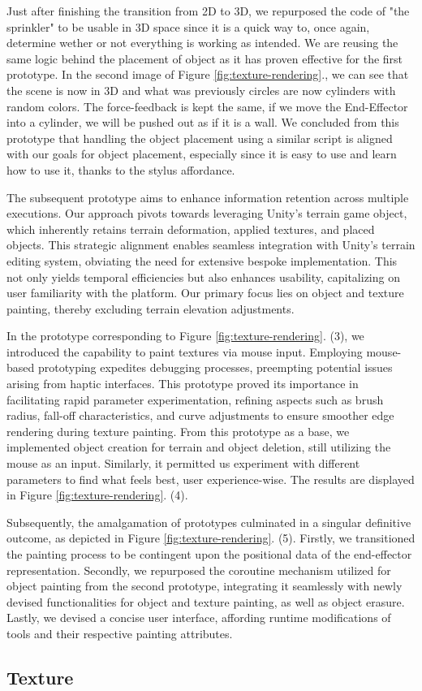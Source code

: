 Just after finishing the transition from 2D to 3D, we repurposed the code of "the sprinkler" to be usable in 3D space since it is a quick way to, once again, determine wether or not everything is working as intended.
We are reusing the same logic behind the placement of object as it has proven effective for the first prototype.
In the second image of Figure \ref{fig:texture-rendering}., we can see that the scene is now in 3D and what was previously circles are now cylinders with random colors.
The force-feedback is kept the same, if we move the End-Effector into a cylinder, we will be pushed out as if it is a wall.
We concluded from this prototype that handling the object placement using a similar script is aligned with our goals for object placement, especially since it is easy to use and learn how to use it, thanks to the stylus affordance. 

The subsequent prototype aims to enhance information retention across multiple executions. 
Our approach pivots towards leveraging Unity's terrain game object, which inherently retains terrain deformation, applied textures, and placed objects. 
This strategic alignment enables seamless integration with Unity's terrain editing system, obviating the need for extensive bespoke implementation. 
This not only yields temporal efficiencies but also enhances usability, capitalizing on user familiarity with the platform. 
Our primary focus lies on object and texture painting, thereby excluding terrain elevation adjustments. 

In the prototype corresponding to Figure \ref{fig:texture-rendering}. (3), we introduced the capability to paint textures via mouse input. 
Employing mouse-based prototyping expedites debugging processes, preempting potential issues arising from haptic interfaces. 
This prototype proved its importance in facilitating rapid parameter experimentation, refining aspects such as brush radius, fall-off characteristics, and curve adjustments to ensure smoother edge rendering during texture painting.
From this prototype as a base, we implemented object creation for terrain and object deletion, still utilizing the mouse as an input.
Similarly, it permitted us experiment with different parameters to find what feels best, user experience-wise. 
The results are displayed in Figure \ref{fig:texture-rendering}. (4).

Subsequently, the amalgamation of prototypes culminated in a singular definitive outcome, as depicted in Figure \ref{fig:texture-rendering}. (5).
Firstly, we transitioned the painting process to be contingent upon the positional data of the end-effector representation. 
Secondly, we repurposed the coroutine mechanism utilized for object painting from the second prototype, integrating it seamlessly with newly devised functionalities for object and texture painting, as well as object erasure. 
Lastly, we devised a concise user interface, affording runtime modifications of tools and their respective painting attributes.

\subsection{Texture}
